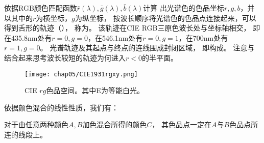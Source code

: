 依据RGB颜色匹配函数$\bar{r}(\lambda),\bar{g}(\lambda),\bar{b}(\lambda)$计算
出光谱色的色品坐标$r,g,b$，并以其中的$r$为横坐标，$g$为纵坐标，
按波长顺序将光谱色的色品点连接起来，可以得到舌形的轨迹（），
称为。
该轨迹在CIE RGB三原色波长处与坐标轴相交，
即在435.8nm处有$r=0,g=0$，在546.1nm处有$r=0,g=1$，在700nm处有$r=1,g=0$。
光谱轨迹及其起点与终点的连线围成封闭区域，
即构成。
注意与结合起来思考波长较短的轨迹为何进入$r<0$的半平面。
\begin{figure}[htbp]
      \centering\texttt{[image: chap05/CIE1931rgxy.png]}
      \caption{CIE $rg$色品空间。其中E为等能白光。}
      \label{fig:5.ex09}
\end{figure}

依据颜色混合的线性性质，我们有：
\begin{corollary}
      对于由任意两种颜色$A,B$加色混合所得的颜色$C$，
      其色品点一定在$A$与$B$色品点所连的线段上。
\end{corollary}

